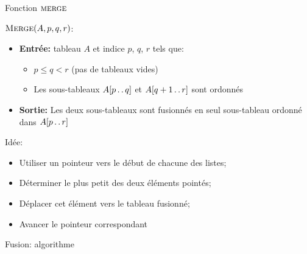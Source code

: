 \begin{frame}{Fonction $\textnormal{\scshape merge}$}

$\textnormal{\scshape Merge}(A,p,q,r)$:
\begin{itemize}
\item {\bf Entrée:} tableau $A$ et indice $p$, $q$, $r$ tels que:
\begin{itemize}
\item $p\leq q<r$ (pas de tableaux vides)
\item Les sous-tableaux $A[p\mathinner{\ldotp\ldotp} q]$ et $A[q+1\mathinner{\ldotp\ldotp} r]$ sont ordonnés
\end{itemize}
\item {\bf Sortie:} Les deux sous-tableaux sont fusionnés en seul sous-tableau ordonné dans $A[p\mathinner{\ldotp\ldotp} r]$
\end{itemize}

\bigskip

Idée:
\begin{itemize}
\item Utiliser un pointeur vers le début de chacune des listes;
\item Déterminer le plus petit des deux éléments pointés;
\item Déplacer cet élément vers le tableau fusionné;
\item Avancer le pointeur correspondant
\end{itemize}


\end{frame}

\begin{frame}{Fusion: algorithme}

\begin{center}\small
\end{center}

\end{frame}

